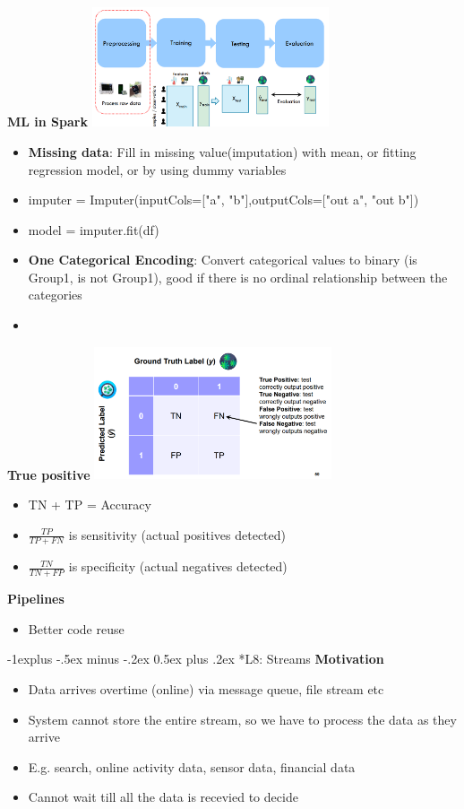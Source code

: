 \documentclass[10pt, landscape]{article}
\makeatletter
\renewcommand{\subsection}{\@startsection{subsection}{2}{0mm}%
                                {-1explus -.5ex minus -.2ex}%
                                {0.5ex plus .2ex}%
                                {\normalfont\normalsize\bfseries}}
\makeatother
\begin{document}
\begin{multicols}{4}
\textbf{ML in Spark}
\includegraphics*[width=7cm]{spark_ml.png}
\begin{itemize}
  \item \textbf{Missing data}: Fill in missing value(imputation) with mean, or fitting regression model, or by using dummy variables
  \item imputer = Imputer(inputCols=["a", "b"],outputCols=["out a", "out b"])
  \item model = imputer.fit(df)
  \item \textbf{One Categorical Encoding}: Convert categorical values to binary (is Group1, is not Group1), good if there is no ordinal relationship between the categories
  \item 
\end{itemize}

\textbf{True positive}
\includegraphics*[width=7cm]{tpfp.png}
\begin{itemize}
  \item TN + TP = Accuracy 
  \item $\frac{TP}{TP+FN}$ is sensitivity (actual positives detected)
  \item $\frac{TN}{TN+FP}$ is specificity (actual negatives detected)
\end{itemize}

\textbf{Pipelines}
\begin{itemize}
  \item Better code reuse 
\end{itemize}

\subsection*{L8: Streams}
\textbf{Motivation}
\begin{itemize}
  \item Data arrives overtime (online) via message queue, file stream etc
  \item System cannot store the entire stream, so we have to process the data as they arrive
  \item E.g. search, online activity data, sensor data, financial data
  \item Cannot wait till all the data is recevied to decide
\end{itemize}


\end{multicols}
\end{document}
